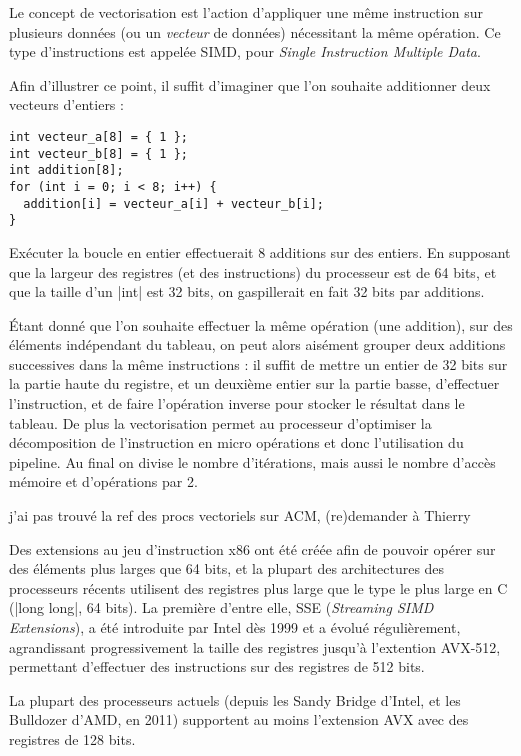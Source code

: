 Le concept de vectorisation est l'action d'appliquer une même instruction sur plusieurs données (ou un \emph{vecteur} de données) nécessitant la même opération.
Ce type d'instructions est appelée SIMD, pour \emph{Single Instruction Multiple Data}.

Afin d'illustrer ce point, il suffit d'imaginer que l'on souhaite additionner deux vecteurs d'entiers :
\begin{lstlisting}
int vecteur_a[8] = { 1 };
int vecteur_b[8] = { 1 };
int addition[8];
for (int i = 0; i < 8; i++) {
  addition[i] = vecteur_a[i] + vecteur_b[i];
}
\end{lstlisting}

Exécuter la boucle en entier effectuerait 8 additions sur des entiers.
En supposant que la largeur des registres (et des instructions) du processeur est de 64 bits, et que la taille d'un |int| est 32 bits, on gaspillerait en fait 32 bits par additions.

Étant donné que l'on souhaite effectuer la même opération (une addition), sur des éléments indépendant du tableau, on peut alors aisément grouper deux additions successives dans la même instructions : il suffit de mettre un entier de 32 bits sur la partie haute du registre, et un deuxième entier sur la partie basse, d'effectuer l'instruction, et de faire l'opération inverse pour stocker le résultat dans le tableau.
De plus la vectorisation permet au processeur d'optimiser la décomposition de l'instruction en micro opérations et donc l'utilisation du pipeline.
Au final on divise le nombre d'itérations, mais aussi le nombre d'accès mémoire et d'opérations par 2.

\begin{todo}
  j'ai pas trouvé la ref des procs vectoriels sur ACM, (re)demander à Thierry
\end{todo}

Des extensions au jeu d'instruction x86 ont été créée afin de pouvoir opérer sur des éléments plus larges que 64 bits, et la plupart des architectures des processeurs récents utilisent des registres plus large que le type le plus large en C (|long long|, 64 bits).
La première d'entre elle, SSE (\emph{Streaming SIMD Extensions}), a été introduite par Intel dès 1999 et a évolué régulièrement, agrandissant progressivement la taille des registres jusqu'à l'extention AVX-512, permettant d'effectuer des instructions sur des registres de 512 bits.

La plupart des processeurs actuels (depuis les Sandy Bridge d'Intel, et les Bulldozer d'AMD, en 2011) supportent au moins l'extension AVX avec des registres de 128 bits.

